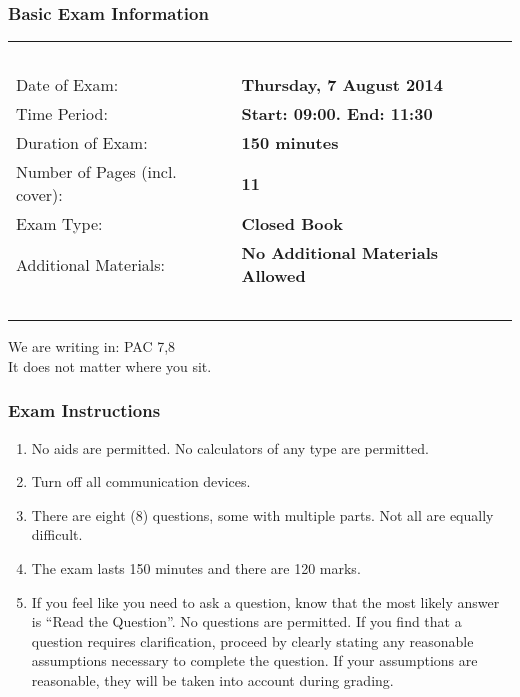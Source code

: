 \begin{frame}
\frametitle{Basic Exam Information}

\begin{table}[h]
 \begin{tabular}{|l l|}
        	\hline
			~ & ~ \\	
			Date of Exam: & \textbf{Thursday, 7 August 2014} \\
			Time Period: & \textbf{Start: 09:00. End: 11:30}\\
			Duration of Exam: & \textbf{150 minutes}\\
			Number of Pages (incl. cover): & \textbf{11}\\
			Exam Type: & \textbf{Closed Book}\\
			Additional Materials: & \textbf{No Additional Materials Allowed}\\
			~ & ~\\
			\hline
          \end{tabular}
\end{table}

We are writing in: PAC 7,8 \\
It does not matter where you sit.

\end{frame}


\begin{frame}
\frametitle{Exam Instructions}

\begin{enumerate}
	\item No aids are permitted. No calculators of any type are permitted.
	\item Turn off all communication devices.
	\item There are eight (8) questions, some with multiple parts. Not all are equally difficult.
	\item The exam lasts 150 minutes and there are 120 marks.
	\item If you feel like you need to ask a question, know that the most likely answer is ``Read the Question''. No questions are permitted. If you find that a question requires clarification, proceed by clearly stating any reasonable assumptions necessary to complete the question. If your assumptions are reasonable, they will be taken into account during grading.  
\end{enumerate}

\end{frame}



